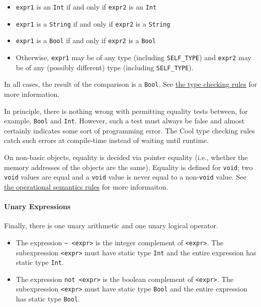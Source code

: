 \documentclass[]{article}
\begin{document}
\begin{itemize}
\itemsep1pt\parskip0pt
\item
  \texttt{expr1} is an \texttt{Int} if and only if \texttt{expr2} is an
  \texttt{Int}
\item
  \texttt{expr1} is a \texttt{String} if and only if \texttt{expr2} is a
  \texttt{String}
\item
  \texttt{expr1} is a \texttt{Bool} if and only if \texttt{expr2} is a
  \texttt{Bool}
\item
  Otherwise, \texttt{expr1} may be of any type (including
  \texttt{SELF\_TYPE}) and \texttt{expr2} may be of any (possibly
  different) type (including \texttt{SELF\_TYPE}).
\end{itemize}

In all cases, the result of the comparison is a \texttt{Bool}. See
\href{node43.html}{the type checking rules} for more information.

In principle, there is nothing wrong with permitting equality tests
between, for example, \texttt{Bool} and \texttt{Int}. However, such a
test must always be false and almost certainly indicates some sort of
programming error. The Cool type checking rules catch such errors at
compile-time instead of waiting until runtime.

On non-basic objects, equality is decided via pointer equality (i.e.,
whether the memory addresses of the objects are the same). Equality is
defined for \texttt{void}: two \texttt{void} values are equal and a
\texttt{void} value is never equal to a non-\texttt{void} value. See
\href{node48.html}{the operational semantics rules} for more
informaiton.

\paragraph{Unary Expressions}

Finally, there is one unary arithmetic and one unary logical operator.

\begin{itemize}
\itemsep1pt\parskip0pt
\item
  The expression
  \texttt{\textasciitilde{} \textless{}expr\textgreater{}} is the
  integer complement of \texttt{\textless{}expr\textgreater{}}. The
  subexpression \texttt{\textless{}expr\textgreater{}} must have static
  type \texttt{Int} and the entire expression has static type
  \texttt{Int}.
\item
  The expression \texttt{not \textless{}expr\textgreater{}} is the
  boolean complement of \texttt{\textless{}expr\textgreater{}}. The
  subexpression \texttt{\textless{}expr\textgreater{}} must have static
  type \texttt{Bool} and the entire expression has static type
  \texttt{Bool}.
\end{itemize}
\end{document}
